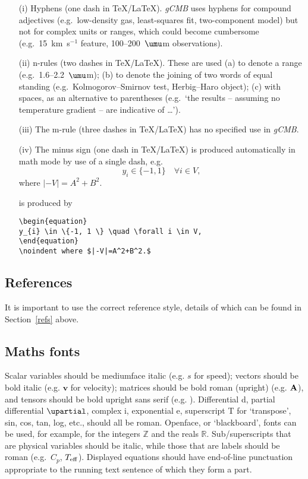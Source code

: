 \documentclass{gCMB2e}
\begin{document}
\begin{enumerate}
\item[(i)] Hyphens (one dash in \TeX/\LaTeX). {\it gCMB} uses hyphens for compound adjectives (e.g.\ low-density gas, least-squares fit,
two-component  model) but not for complex  units  or ranges, which could become cumbersome (e.g.\ 15~km~s$^{-1}$
feature, 100--200~$\umu$m observations).

\item[(ii)] n-rules (two dashes in \TeX/\LaTeX). These are used (a) to denote a range (e.g.\ 1.6--2.2~$\umu$m);
(b) to denote the joining of two words of equal standing (e.g.\ Kolmogorov--Smirnov  test, Herbig--Haro object);
(c) with spaces, as an alternative to parentheses (e.g.\ `the results -- assuming no temperature gradient -- are indicative of \ldots').

\item[(iii)] The  m-rule (three dashes in \TeX/\LaTeX) has no specified use in {\it gCMB}.

\item[(iv)] The minus sign (one dash in \TeX/\LaTeX) is produced
automatically in math mode by use of a single dash, e.g.
\begin{equation}
y_{i} \in \{-1, 1 \} \quad \forall i \in V,
\end{equation}
\noindent where $|-V|=A^2+B^2.$\medskip

\noindent is produced by

\begin{verbatim}
\begin{equation}
y_{i} \in \{-1, 1 \} \quad \forall i \in V,
\end{equation}
\noindent where $|-V|=A^2+B^2.$
\end{verbatim}

\end{enumerate}


\subsection{References}

It is important to use the correct reference style, details  of which can be found in Section~\ref{refs} above.


\subsection{Maths fonts}

Scalar  variables should be mediumface italic (e.g. $s$ for
speed); vectors should be bold italic (e.g. $\bm v$ for velocity);
matrices should be bold roman (upright) (e.g. $\bf A$), and
tensors should be bold upright sans serif (e.g. {}). Differential d, partial differential $\upartial$, complex i,
exponential e, superscript T for `transpose', sin, cos, tan, log,
etc., should all be roman. Openface, or `blackboard', fonts can be
used, for example, for the integers $\mathbb Z$ and the reals
$\mathbb R$. Sub/superscripts that are physical variables should
be italic, while those  that are labels should be roman (e.g.\
$C_p$, $T_{\rm eff}$). Displayed equations should have end-of-line
punctuation appropriate to the running text sentence of which they
form a part.
\end{document}
